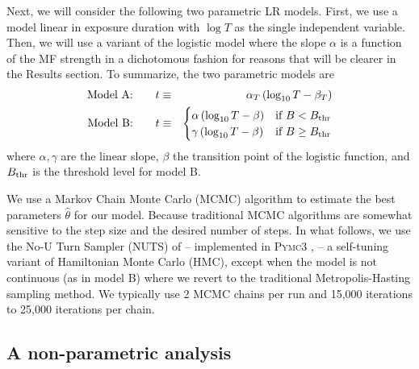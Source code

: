 \documentclass[letter,twoside]{article}
\begin{document}
Next, we will consider the following two parametric LR models. First, we use a  model linear in exposure duration with $\log T$ as the single independent variable. Then,  we will use a variant of the logistic model where the slope $\alpha$ is a function of the MF strength in a dichotomous fashion for reasons that will be clearer in the Results section. 
To summarize, the two   parametric models are
\begin{eqnarray}
\hbox{Model A:}\qquad 
t&\equiv&\alpha_T\,(\log_{10} T-\beta_T)   \label{eq:model1}\\
\hbox{Model B:}\qquad 
t&\equiv& \begin{cases}
 \alpha\, ( \log_{10} T - \beta ) & \text{if $ B < B_{\rm thr}$}\\
 \gamma\,( \log_{10} T-\beta ) & \text{if $B\geq B_{\rm thr}$} 
\end{cases}\label{eq:model3}
\end{eqnarray}
where $\alpha,\gamma$ are the linear slope, $\beta$ the transition point of the logistic function, and $B_{\rm thr}$ is the threshold level for model B. 


We  use a Markov Chain Monte Carlo  
(MCMC) algorithm to estimate the best parameters $\hat \theta$ for our model.  Because traditional MCMC algorithms are somewhat sensitive to the step size  and the desired number of steps. In what follows, we use the No-U Turn Sampler (NUTS) of \citet{Hoffman2014} -- implemented in \textsc{Pymc3} \citet{pymc3}, -- a self-tuning variant of Hamiltonian Monte Carlo (HMC), except when the model is not continuous  (as in model B) where we revert to  the traditional Metropolis-Hasting sampling method.
We typically use 2   MCMC chains per run and 15,000 iterations to 25,000 iterations per chain.
 
\subsection*{A non-parametric analysis}
\end{document}
